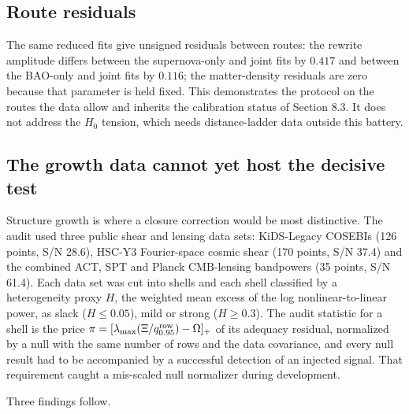 \hypertarget{route-residuals}{%
\subsection{Route residuals}\label{route-residuals}}

The same reduced fits give unsigned residuals between routes: the
rewrite amplitude differs between the supernova-only and joint fits by
\(0.417\) and between the BAO-only and joint fits by \(0.116\); the
matter-density residuals are zero because that parameter is held fixed.
This demonstrates the protocol on the routes the data allow and inherits
the calibration status of Section 8.3. It does not address the \(H_0\)
tension, which needs distance-ladder data outside this battery.

\hypertarget{the-growth-data-cannot-yet-host-the-decisive-test}{%
\subsection{The growth data cannot yet host the decisive
test}\label{the-growth-data-cannot-yet-host-the-decisive-test}}

Structure growth is where a closure correction would be most
distinctive. The audit used three public shear and lensing data sets:
KiDS-Legacy COSEBIs (126 points, S/N 28.6), HSC-Y3 Fourier-space cosmic
shear (170 points, S/N 37.4) and the combined ACT, SPT and Planck
CMB-lensing bandpowers (35 points, S/N 61.4). Each data set was cut into
shells and each shell classified by a heterogeneity proxy \(H\), the
weighted mean excess of the log nonlinear-to-linear power, as slack
(\(H\le0.05\)), mild or strong (\(H\ge0.3\)). The audit statistic for a
shell is the price
\(\pi=[\lambda_{\max}(\Xi/q^{\rm row}_{0.95})-\Omega]_+\) of its
adequacy residual, normalized by a null with the same number of rows and
the data covariance, and every null result had to be accompanied by a
successful detection of an injected signal. That requirement caught a
mis-scaled null normalizer during development.

Three findings follow.

